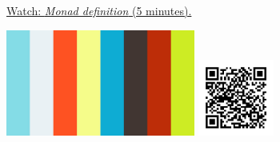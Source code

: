 
\begin{minipage}{10cm}
    \href{https://act4e-spring21.netlify.app/videos/spring2021-monads-a:monad-def.html}{Watch: \emph{Monad definition} (5 minutes).}
        
    \href{https://act4e-spring21.netlify.app/videos/spring2021-monads-a:monad-def.html}{\includegraphics[height=3.5cm]{spring2021-monads-a:monad-def/thumbnails.jpg}}
    \href{https://act4e-spring21.netlify.app/videos/spring2021-monads-a:monad-def.html}{\includegraphics[height=2.5cm]{spring2021-monads-a:monad-def/qrcode.png}}
\end{minipage}
